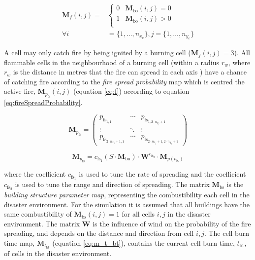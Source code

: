 \documentclass[conference]{IEEEtran}
\begin{document}
\begin{equation}
\label{eq:m_f_init}
\begin{split}
    \bm{M}_{f}(i,j) = &
    \begin{cases} 
        0 & \bm{M}_{\text{bo}}(i,j) = 0 \\
        1 & \bm{M}_{\text{bo}}(i,j) > 0 \\
    \end{cases} \\
    \forall i &= \{1, \ldots, n_{x_{e}}\}, j = \{1, \ldots, n_{y_{e}}\}
\end{split}
\end{equation}

A cell may only catch fire by being ignited by a burning cell ($\bm{M}_{f}(i,j) = 3$).
All flammable cells in the neighbourhood of a burning cell (within a radius $r_{w}$, where $r_{w}$ is the distance in metres that the fire can spread in each axis ) have a chance of catching fire according to the \textit{fire spread probability} map which is centred the active fire, $\bm{M}_{p_{\text{fs}}}(i,j)$ (equation \ref{eq:f}) according to equation \ref{eq:fireSpreadProbability}.

\begin{equation}
\label{eq:f}
    \bm{M}_{p_{\text{fs}}} = 
    \begin{pmatrix}
        p_{\text{fs}_{1,1}} & \cdots & p_{\text{fs}_{1,2 \cdot n_{y_{f}}+1}}\\
        \vdots & \ddots & \vdots \\
        p_{\text{fs}_{2 \cdot n_{x_{f}}+1,1}}& \cdots & p_{\text{fs}_{2 \cdot n_{x_{f}}+1, 2 \cdot n_{y_{f}}+1}}
    \end{pmatrix}
\end{equation}

\begin{equation}
    \label{eq:fireSpreadProbability}
    \bm{M}_{p_{\text{fs}}} = c_{\text{fs}_{1}} ({S} \cdot \bm{M}_{\text{bo}}) \cdot \bm{W}^{c_{\text{fs}_{2}}} \cdot \bm{M}_{p(t_{\text{bt}})}
\end{equation}

where the coefficient $c_{\text{fs}_{1}}$ is used to tune the rate of spreading and the coefficient $c_{\text{fs}_{2}}$ is used to tune the range and direction of spreading.
The matrix $\bm{M}_{\text{bs}}$ is the \textit{building structure parameter map}, representing the combustibility each cell in the disaster environment.
For the simulation it is assumed that all buildings have the same combustibility of $\bm{M}_{\text{bs}}(i,j) = 1$ for all cells $i,j$ in the disaster environment.
The matrix $\bm{W}$ is the influence of wind on the probability of the fire spreading, and depends on the distance and direction from cell $i,j$.
The cell burn time map, $\bm{M}_{t_{\text{bt}}}$ (equation \ref{eq:m_t_bt}), contains the current cell burn time, $t_{\text{bt}}$, of cells in the disaster environment.
\end{document}
